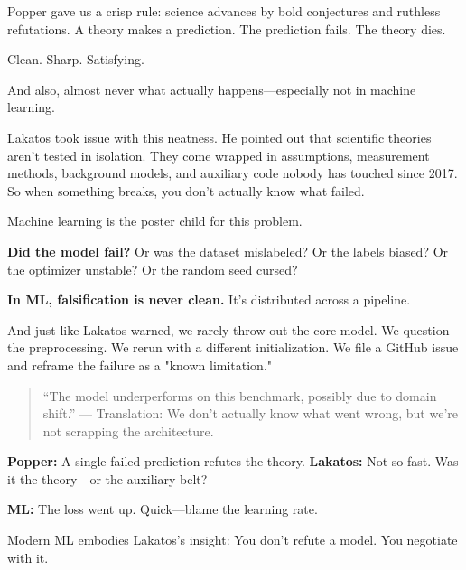 Popper gave us a crisp rule: science advances by bold conjectures and ruthless refutations. A theory makes a prediction. The prediction fails. The theory dies.

Clean. Sharp. Satisfying.

And also, almost never what actually happens—especially not in machine learning.

\bigskip

Lakatos took issue with this neatness. He pointed out that scientific theories aren’t tested in isolation. They come wrapped in assumptions, measurement methods, background models, and auxiliary code nobody has touched since 2017. So when something breaks, you don’t actually know what failed.

Machine learning is the poster child for this problem.

\bigskip

\textbf{Did the model fail?}  
Or was the dataset mislabeled?  
Or the labels biased?  
Or the optimizer unstable?  
Or the random seed cursed?

\bigskip

\textbf{In ML, falsification is never clean.}  
It’s distributed across a pipeline.

And just like Lakatos warned, we rarely throw out the core model. We question the preprocessing. We rerun with a different initialization. We file a GitHub issue and reframe the failure as a "known limitation."

\begin{quote}
    “The model underperforms on this benchmark, possibly due to domain shift.”  
    — Translation: We don’t actually know what went wrong, but we’re not scrapping the architecture.
\end{quote}

\bigskip

\begin{tcolorbox}[colback=gray!5!white, colframe=black, title=\textbf{Sidebar: Popperian Falsification vs. ML Reality}, fonttitle=\bfseries, arc=1.5mm, boxrule=0.4pt]
\textbf{Popper:} A single failed prediction refutes the theory.  
\textbf{Lakatos:} Not so fast. Was it the theory—or the auxiliary belt?

\textbf{ML:} The loss went up. Quick—blame the learning rate.

\medskip

Modern ML embodies Lakatos’s insight:  
You don’t refute a model.  
You negotiate with it.
\end{tcolorbox}

